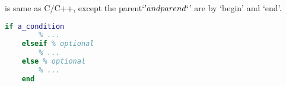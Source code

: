
 is same as C/C++, except the parent`\(' and parend`\)' are by `begin' and `end'.

\begin{lstlisting}[language=MATLAB]
	if a_condition
		% ...
	elseif % optional
		% ...
	else % optional
		% ...
	end
\end{lstlisting}


